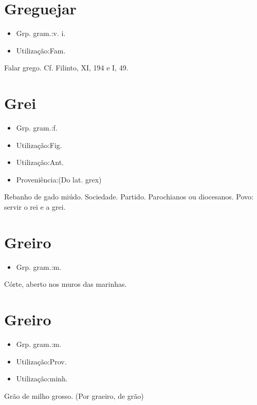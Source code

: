 \section{Greguejar}
\begin{itemize}
\item {Grp. gram.:v. i.}
\end{itemize}
\begin{itemize}
\item {Utilização:Fam.}
\end{itemize}
Falar grego. Cf. Filinto, XI, 194 e I, 49.
\section{Grei}
\begin{itemize}
\item {Grp. gram.:f.}
\end{itemize}
\begin{itemize}
\item {Utilização:Fig.}
\end{itemize}
\begin{itemize}
\item {Utilização:Ant.}
\end{itemize}
\begin{itemize}
\item {Proveniência:(Do lat. \textunderscore grex\textunderscore )}
\end{itemize}
Rebanho de gado miúdo.
Sociedade.
Partido.
Parochianos ou diocesanos.
Povo: \textunderscore servir o rei e a grei\textunderscore .
\section{Greiro}
\begin{itemize}
\item {Grp. gram.:m.}
\end{itemize}
Córte, aberto nos muros das marinhas.
\section{Greiro}
\begin{itemize}
\item {Grp. gram.:m.}
\end{itemize}
\begin{itemize}
\item {Utilização:Prov.}
\end{itemize}
\begin{itemize}
\item {Utilização:minh.}
\end{itemize}
Grão de milho grosso.
(Por \textunderscore graeiro\textunderscore , de \textunderscore grão\textunderscore )
